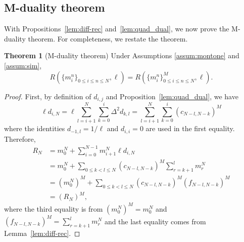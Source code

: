 \documentclass[pdflatex,sn-mathphys-num]{sn-jnl}%
\theoremstyle{thmstyleone}%
\theoremstyle{thmstyletwo}%
\theoremstyle{thmstylethree}%
\begin{document}


\subsection{M-duality theorem}
With Propositions~\ref{lem:diff-rec} and~\ref{lem:quad_dual},  we now prove the M-duality theorem. For completeness, we restate the theorem. 

\vspace{0.2in}
\noindent\textbf{Theorem 1} (M-duality theorem) Under Assumptions \ref{assum:montone} and \ref{assum:sim}, 
\vspace{-0.1in}
    \[R(\{m^n_i\}_{0 \le i \le n \le N}, \ell)
    =
    R(\{m^n_i\}^M_{0 \le i \le n \le N}, \ell).\]
\begin{proof}
First, by definition of $d_{i,j}$ and  Proposition~\ref{lem:quad_dual}, we have
\[\ell d_{i,N}=\ell\sum_{l=i+1}^{N}\sum_{k=0}^{i}\Delta^2d_{k,l}=\sum_{l=i+1}^{N}\sum_{k=0}^{i}(c_{N-l,N-k})^M\]
where the identities $d_{-1,l}=1/\ell$ and $d_{i,i}=0$ are used in the first equality. Therefore,
\begin{align*}
R_N &=m_0^N+\sum_{i=0}^{N-1}m_{i+1}^N\ell d_{i,N}\\
&=m_0^N+\sum_{0\le k<l\le N}(c_{N-l,N-k})^M\sum_{r=k+1}^{l}m_r^N\\
&=(m_0^N)^M+\sum_{0\le k<l\le N}(c_{N-l,N-k})^M(f_{N-l,N-k})^M\\
&=(R_N)^M,
\end{align*}
where the third equality is from $(m_0^N)^M=m_0^N$ and $(f_{N-l,N-k})^M=\sum_{r=k+1}^{l}m_r^N$ and the last equality comes from Lemma~\ref{lem:diff-rec}.
\end{proof}
\end{document}
